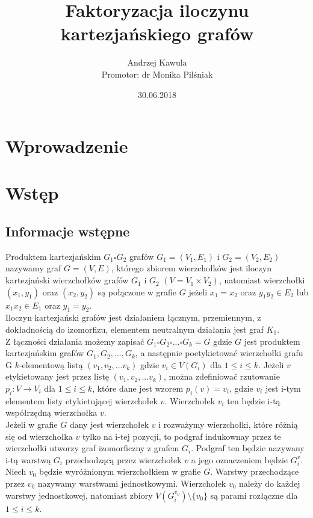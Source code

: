\documentclass[12pt,a4paper,titlepage]{article}
\title{Faktoryzacja iloczynu kartezjańskiego grafów }
\date{30.06.2018}
\author{Andrzej Kawula \\ Promotor: dr Monika Pilśniak}
\begin{document}
\maketitle
\tableofcontents
\newpage
\section{Wprowadzenie}
\section{Wstęp}
\subsection{Informacje wstępne}
Produktem kartezjańskim $G_1 \square G_2 $ grafów $G_1 = (V_1 , E_1 ) $ i $ G_2 =(V_2 , E_2 ) $ nazywamy graf $G = (V, E)$, którego zbiorem wierzchołków jest iloczyn kartezjański wierzchołków grafów $G_1$ i $G_2$ $(V=V_1 \times V_2 )$, natomiast wierzchołki $(x_1, y_1)$ oraz $(x_2, y_2)$ są połączone w grafie $G$ jeżeli $x_1 = x_2$ oraz $y_1 y_2 \in E_2 $ lub $x_1 x_2 \in E_1 $ oraz $y_1 = y_2 $.\\
Iloczyn kartezjański grafów jest działaniem łącznym, przemiennym, z dokładnością do izomorfizu, elementem neutralnym działania jest graf $K_1$.\\
Z łączności działania możemy zapisać $G_1 \square G_2 \square ... \square G_k = G$ gdzie $G$ jest produktem kartezjańskim grafów $G_1, G_2, ... , G_k$, a następnie poetykietować wierzchołki grafu G $k$-elementową listą $(v_1, v_2 , ... v_k )$ gdzie $v_i \in V(G_i)$ dla $1 \leqslant i \leqslant k $. Jeżeli $v$ etykietowany jest przez listę $(v_1, v_2 , ... v_k )$, można zdefiniować rzutowanie $p_i : V \rightarrow V_i $ dla $1 \leqslant i \leqslant k $, które dane jest wzorem $p_i (v) = v_i $, gdzie $v_i$ jest i-tym elementem listy etykietującej wierzchołek $v$. Wierzchołek $v_i $ ten będzie i-tą współrzędną wierzchołka $v$. \\
Jeżeli w grafie $G$ dany jest wierzchołek $v$ i rozważymy wierzchołki, które różnią się od wierzchołka $v$ tylko na i-tej pozycji, to podgraf indukownay przez te wierzchołki utworzy graf izomorficzny z grafem $G_i$. Podgraf ten będzie nazywany i-tą warstwą $G_i$ przechodzącą przez wierzchołek $v$ a jego oznaczeniem będzie $G_i ^v$.\\
Niech $v_0$ będzie wyróżnionym wierzchołkiem w grafie $G$. Warstwy przechodzące przez $v_0$ nazywamy warstwami jednostkowymi. Wierzchołek $v_0$ należy do każdej warstwy jednostkowej, natomiast zbiory $V(G_i ^{v_0}) \setminus \{v_0\}$ są parami rozłączne dla $1 \leqslant i \leqslant k $.
\end{document}
